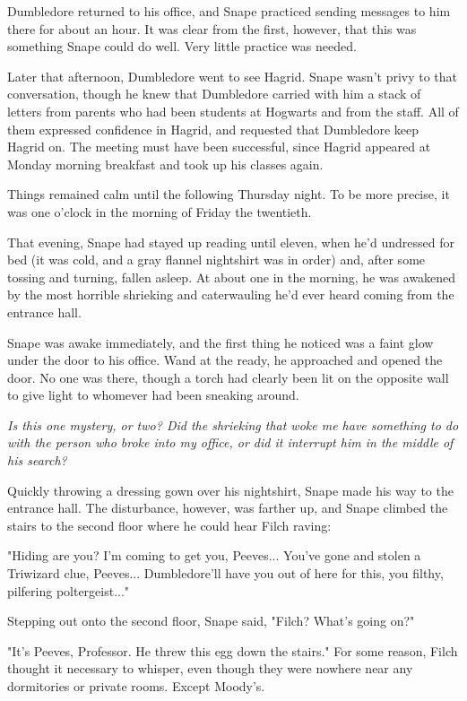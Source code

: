 \documentclass[a4paper,11pt]{article}
\begin{document}
Dumbledore returned to his office, and Snape practiced sending messages to him there for about an hour. It was clear from the first, however, that this was something Snape could do well. Very little practice was needed.

Later that afternoon, Dumbledore went to see Hagrid. Snape wasn't privy to that conversation, though he knew that Dumbledore carried with him a stack of letters from parents who had been students at Hogwarts and from the staff. All of them expressed confidence in Hagrid, and requested that Dumbledore keep Hagrid on. The meeting must have been successful, since Hagrid appeared at Monday morning breakfast and took up his classes again.

Things remained calm until the following Thursday night. To be more precise, it was one o'clock in the morning of Friday the twentieth.

That evening, Snape had stayed up reading until eleven, when he'd undressed for bed (it was cold, and a gray flannel nightshirt was in order) and, after some tossing and turning, fallen asleep. At about one in the morning, he was awakened by the most horrible shrieking and caterwauling he'd ever heard coming from the entrance hall.

Snape was awake immediately, and the first thing he noticed was a faint glow under the door to his office. Wand at the ready, he approached and opened the door. No one was there, though a torch had clearly been lit on the opposite wall to give light to whomever had been sneaking around.

\emph{Is this one mystery, or two? Did the shrieking that woke me have something to do with the person who broke into my office, or did it interrupt him in the middle of his search?}

Quickly throwing a dressing gown over his nightshirt, Snape made his way to the entrance hall. The disturbance, however, was farther up, and Snape climbed the stairs to the second floor where he could hear Filch raving:

"Hiding are you? I'm coming to get you, Peeves... You've gone and stolen a Triwizard clue, Peeves... Dumbledore'll have you out of here for this, you filthy, pilfering poltergeist..."

Stepping out onto the second floor, Snape said, "Filch? What's going on?"

"It's Peeves, Professor. He threw this egg down the stairs." For some reason, Filch thought it necessary to whisper, even though they were nowhere near any dormitories or private rooms. Except Moody's.
\end{document}

